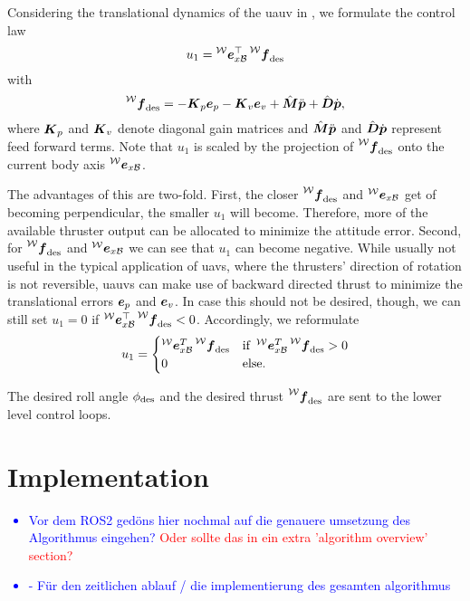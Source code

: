 Considering the translational dynamics of the \ac{uauv} in , we formulate the control law
\begin{equation}
	\label{eq:translational-control-law-short}
	u_1 = \exbodyinworld^\top \thrustdesiredworld
\end{equation}
with
\begin{equation}
	\thrustdesiredworld =
	-\Kb_p \eb_p
	- \Kb_v \eb_v
	+ \hat{\bm{M}} \pbpp
	+ \hat{\bm{D}} \pbp
	,
\end{equation}
where $\mbox{$\bm{K}$}_p$ and $\mbox{$\bm{K}$}_v$ denote diagonal gain matrices and $\hat{\bm{M}} \mbox{$\ddot{\bm{p}}$}$ and $\hat{\bm{D}}\mbox{$\dot{\bm{p}}$}$ represent feed forward terms. Note that $u_1$ is scaled by the projection of $\thrustdesiredworld$ onto the current body axis $\prescript{\mathcal{W}}{}{\mbox{$\bm{e}$}}_{x\mathcal{B}}$.

The advantages of this are two-fold. First, the closer $\thrustdesiredworld$ and $\prescript{\mathcal{W}}{}{\mbox{$\bm{e}$}}_{x\mathcal{B}}$ get of becoming perpendicular, the smaller $u_1$ will become. Therefore, more of the available thruster output can be allocated to minimize the attitude error. Second, for $\thrustdesiredworld$ and $\prescript{\mathcal{W}}{}{\mbox{$\bm{e}$}}_{x\mathcal{B}}$ we can see that $u_1$ can become negative. While usually not useful in the typical application of \acp{uav}, where the thrusters' direction of rotation is not reversible, \acp{uauv} can make use of backward directed thrust to minimize the translational errors $\mbox{$\bm{e}$}_p$ and $\mbox{$\bm{e}$}_v$. In case this should not be desired, though, we can still set $u_1=0$ if $\exbodyinworld^\top \thrustdesiredworld < 0$. Accordingly, we reformulate 
\begin{equation}
	u_1 = 
	\begin{cases}
		\exbodyinworld^T \thrustdesiredworld & \text{if } \exbodyinworld^T \thrustdesiredworld > 0 \\
		0 & \text{else.}
	\end{cases}
\end{equation}

The desired roll angle $\phi_{\text{des}}$ and the desired thrust $\thrustdesiredworld$ are sent to the lower level control loops.




\section{Implementation}
\label{sec:implementation}


\textcolor{blue}{
\begin{itemize}
    \item Vor dem ROS2 gedöns hier nochmal auf die genauere umsetzung des Algorithmus eingehen? \textcolor{red}{Oder sollte das in ein extra 'algorithm overview' section? }
    \item {} - Für den zeitlichen ablauf / die implementierung des gesamten algorithmus
\end{itemize}
}

